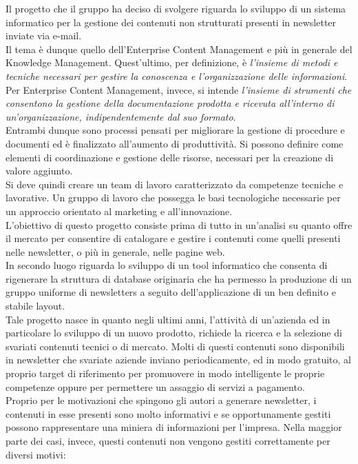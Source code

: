 Il progetto che il gruppo \GRUPPO{} ha deciso di svolgere riguarda lo sviluppo di un sistema informatico per la gestione dei contenuti non strutturati presenti in newsletter inviate via e-mail.\\
Il tema è dunque quello dell'Enterprise Content Management e più in generale del Knowledge Management. Quest'ultimo, per definizione, è \textit{l'insieme di metodi e tecniche necessari per gestire la conoscenza e l'organizzazione delle informazioni}. \\
Per Enterprise Content Management, invece, si intende \textit{l'insieme di strumenti che consentono la gestione della documentazione prodotta e ricevuta all'interno di un'organizzazione, indipendentemente dal suo formato}.\\
Entrambi dunque sono processi pensati per migliorare la gestione di procedure e documenti ed è finalizzato all'aumento di produttività. Si possono definire come elementi di coordinazione e gestione delle risorse, necessari per la creazione di valore aggiunto.\\
Si deve quindi creare un team di lavoro caratterizzato da competenze tecniche e lavorative. Un gruppo di lavoro che possegga le basi tecnologiche necessarie per un approccio orientato al marketing e all'innovazione.\\
L'obiettivo di questo progetto consiste prima di tutto in un'analisi su quanto offre il mercato per consentire di catalogare e gestire i contenuti come quelli presenti nelle newsletter, o più in generale, nelle pagine web.\\
In secondo luogo riguarda lo sviluppo di un tool informatico che consenta di rigenerare la struttura di database originaria che ha permesso la produzione di un gruppo uniforme di newsletters a seguito dell'applicazione di un ben definito e stabile layout.\\
Tale progetto nasce in quanto negli ultimi anni, l'attività di un'azienda ed in particolare lo sviluppo di un nuovo prodotto, richiede la ricerca e la selezione di svariati contenuti tecnici o di mercato. Molti di questi contenuti sono disponibili in newsletter che svariate aziende inviano periodicamente, ed in modo gratuito, al proprio target di riferimento per promuovere in modo intelligente le proprie competenze oppure per permettere un assaggio di servizi a pagamento.\\
Proprio per le motivazioni che spingono gli autori a generare newsletter, i contenuti in esse presenti sono molto informativi e se opportunamente gestiti possono rappresentare una miniera di informazioni per l'impresa. Nella maggior parte dei casi, invece, questi contenuti non vengono gestiti correttamente per diversi motivi:
